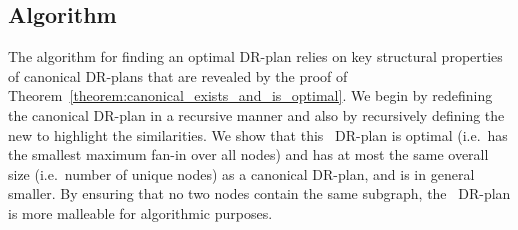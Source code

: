 

\subsection{Algorithm}
\label{sec:DRP:algo}


The algorithm for finding an optimal DR-plan relies on key structural properties of canonical DR-plans that are revealed by the proof of Theorem~\ref{theorem:canonical_exists_and_is_optimal}. We begin by redefining the canonical DR-plan in a recursive manner and also by recursively defining the new  to highlight the similarities. We show that this \pseudosequential\ DR-plan is optimal (i.e.\ has the smallest maximum fan-in over all nodes) and has at most the same overall size (i.e.\ number of unique nodes) as a canonical DR-plan, and is in general smaller.
By ensuring that no two nodes contain the same subgraph,
the \pseudosequential\ DR-plan is more malleable for algorithmic purposes.



